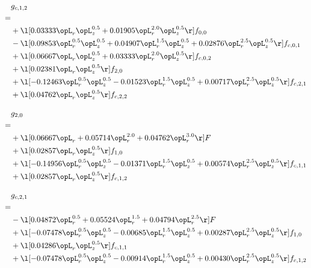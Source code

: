 \begin{alignat}{2} 
\label{eq:g_12_0} 
& g_{c,1,2} \nonumber \\ 
 = \\ 
& + \l[  0.03333 \opL_r \opL_z^{0.5} +  0.01905 \opL_r^{2.0} \opL_z^{0.5}  \r] f_{0,0} \nonumber \\ 
& - \l[  0.09853 \opL_r^{0.5} \opL_z^{0.5} +  0.04907 \opL_r^{1.5} \opL_z^{0.5} +  0.02876 \opL_r^{2.5} \opL_z^{0.5}  \r] f_{c,0,1} \nonumber \\ 
& + \l[  0.06667 \opL_r \opL_z^{0.5} +  0.03333 \opL_r^{2.0} \opL_z^{0.5}  \r] f_{c,0,2} \nonumber \\ 
& + \l[  0.02381 \opL_r \opL_z^{0.5}  \r] f_{2,0} \nonumber \\ 
& + \l[  -0.12463 \opL_r^{0.5} \opL_z^{0.5}   -0.01523 \opL_r^{1.5} \opL_z^{0.5} +  0.00717 \opL_r^{2.5} \opL_z^{0.5}  \r] f_{c,2,1} \nonumber \\ 
& + \l[  0.04762 \opL_r \opL_z^{0.5}  \r] f_{c,2,2} \nonumber \\ 
\end{alignat} 


\begin{alignat}{2} 
\label{eq:g_20_0} 
& g_{2,0} \nonumber \\ 
 = \\ 
& + \l[  0.06667 \opL_r +  0.05714 \opL_r^{2.0} +  0.04762 \opL_r^{3.0}  \r] F \nonumber \\ 
& + \l[  0.02857 \opL_r \opL_z^{0.5}  \r] f_{1,0} \nonumber \\ 
& + \l[  -0.14956 \opL_r^{0.5} \opL_z^{0.5}   -0.01371 \opL_r^{1.5} \opL_z^{0.5} +  0.00574 \opL_r^{2.5} \opL_z^{0.5}  \r] f_{c,1,1} \nonumber \\ 
& + \l[  0.02857 \opL_r \opL_z^{0.5}  \r] f_{c,1,2} \nonumber \\ 
\end{alignat} 


\begin{alignat}{2} 
\label{eq:g_21_0} 
& g_{c,2,1} \nonumber \\ 
 = \\ 
& - \l[  0.04872 \opL_r^{0.5} +  0.05524 \opL_r^{1.5} +  0.04794 \opL_r^{2.5}  \r] F \nonumber \\ 
& + \l[  -0.07478 \opL_r^{0.5} \opL_z^{0.5}   -0.00685 \opL_r^{1.5} \opL_z^{0.5} +  0.00287 \opL_r^{2.5} \opL_z^{0.5}  \r] f_{1,0} \nonumber \\ 
& + \l[  0.04286 \opL_r \opL_z^{0.5}  \r] f_{c,1,1} \nonumber \\ 
& + \l[  -0.07478 \opL_r^{0.5} \opL_z^{0.5}   -0.00914 \opL_r^{1.5} \opL_z^{0.5} +  0.00430 \opL_r^{2.5} \opL_z^{0.5}  \r] f_{c,1,2} \nonumber \\ 
\end{alignat} 


